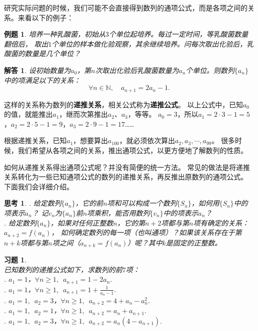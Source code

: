 \documentclass[12pt,UTF8]{ctexbook}
\newtheorem{et}{例题}[section]
\newtheorem{sk}{思考}[section]
\newtheorem*{so}{解答}
\newtheorem{xt}{习题}[section]
\begin{document}
研究实际问题的时候，我们可能不会直接得到数列的通项公式，而是各项之间的关系。来看以下的例子：
\begin{et}
培养一种乳酸菌，初始从$3$个单位起培养。每过一定时间，等乳酸菌数量翻倍后，
取出$1$个单位的样本做化验观察，其余继续培养。问每次取出化验后，乳酸菌的数量是几个单位？
\end{et}
\begin{so}
设初始数量为$a_0$，第$n$次取出化验后乳酸菌数量为$a_n$个单位。则数列$\{a_n\}$中的项满足以下的关系：
$$ \forall n \in \mathbb{N}, \quad a_{n+1} = 2a_n - 1. $$
\end{so}
这样的关系称为数列的\textbf{递推关系}，相关公式称为\textbf{递推公式}。
以上公式中，已知$a_0$的值，就能推出$a_1$，继而次第推出$a_2$、$a_3$，等等。
$a_0 = 3$，所以$a_1 = 2\cdot 3 - 1= 5$，$a_2 = 2\cdot 5 - 1= 9$，$a_3 = 2\cdot 9 - 1= 17$……

根据递推关系，已知$a_1$，想要算出$a_{100}$，就必须依次算出$a_2,a_3,\cdots,a_{99}$。
很多时候，我们希望从各项之间的关系，推出通项公式，以更方便地了解数列的性质。

如何从递推关系得出通项公式呢？并没有简便的统一方法。
常见的做法是将递推关系转化为一些已知通项公式的数列的递推关系，再反推出原数列的通项公式。
下面我们会详细介绍。

\begin{sk}
    . 给定数列$\{a_n\}$，它的前$n$项和可以构成一个数列$\{S_n\}$，如何用$\{S_n\}$中的项表示$a_n$？
记$v_n$为$\{a_n\}$前$n$项乘积，能否用数列$\{v_n\}$中的项表示$a_n$？\\
    . 给定数列$\{a_n\}$，如果对任何正整数$n$，它的第$n+2$项都与第$n$项有确定的关系：$a_{n+2} = f(a_n)$，
    如何确定数列的每一项（也叫通项）？如果该关系存在于第$n+k$项都与第$n$项之间（$a_{n+k} = f(a_n)$）呢？其中$k$是固定的正整数。
\end{sk}

\begin{xt}
\mbox{}\\
已知数列的递推公式如下，求数列的前$7$项：\\
. $a_1 = 1$，$\forall n \geqslant 1, \,\,\, a_{n+1} = 1 - 2a_n.$\\
. $a_1 = 1$，$\forall n \geqslant 1, \,\,\, a_{n+1} = 1 + \frac{1}{a_n - 1}.$\\
. $a_1 = 1, \,\, \, a_2 = 3$，$\forall n \geqslant 1, \,\,\, a_{n+2} = 4 + a_n - a_n^2.$\\
. $a_1 = 1, \,\, \, a_2 = 1$，$\forall n \geqslant 1, \,\,\, a_{n+2} = a_n +a_{n+1}.$\\
. $a_1 = 1, \,\, \, a_2 = 3$，$\forall n \geqslant 1, \,\,\, a_{n+2} = a_n(4 - a_{n+1}).$
\end{xt}
\end{document}
